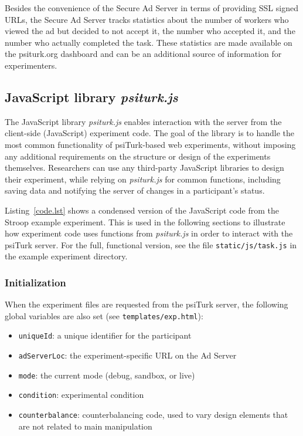 \documentclass[twocolumn]{svjour3}          %
\newcommand{\psiturk}[0]{\textsf{psiTurk}}
\newcommand{\psiturkjs}[0]{\emph{psiturk.js}}
\begin{document}
Besides the convenience of the Secure Ad Server in terms of providing
SSL signed URLs, the Secure Ad Server tracks statistics about the
number of workers who viewed the ad but decided to not accept it, the
number who accepted it, and the number who actually completed the task.
These statistics are made available on the psiturk.org dashboard
and can be an additional source of information for experimenters.


\subsection{JavaScript library \psiturkjs{}}

The JavaScript library \psiturkjs{} enables interaction with the server from the client-side (JavaScript) experiment code.
The goal of the library is to handle the most common functionality of \psiturk{}-based web experiments, without imposing any additional requirements on the structure or design of the experiments themselves.
Researchers can use any third-party JavaScript libraries to design their experiment, while relying on \psiturkjs{} for common functions, including saving data and notifying the server of changes in a participant's status.

Listing~\ref{code.lst} shows a condensed version of the JavaScript code from the Stroop example experiment.
This is used in the following sections to illustrate how experiment code uses functions from \psiturkjs{} in order to interact with the \psiturk{} server.
For the full, functional version, see the file \texttt{static/js/task.js} in the example experiment directory.

\subsubsection{Initialization}

When the experiment files are requested from the \psiturk{} server, the following global variables are also set (see \texttt{templates/exp.html}):

\begin{itemize}
\item \texttt{uniqueId}: a unique identifier for the participant
\item \texttt{adServerLoc}: the experiment-specific URL on the Ad Server
\item \texttt{mode}: the current mode (debug, sandbox, or live)
\item \texttt{condition}: experimental condition
\item \texttt{counterbalance}: counterbalancing code, used to vary design elements that are not related to main manipulation 
\end{itemize}
\end{document}
